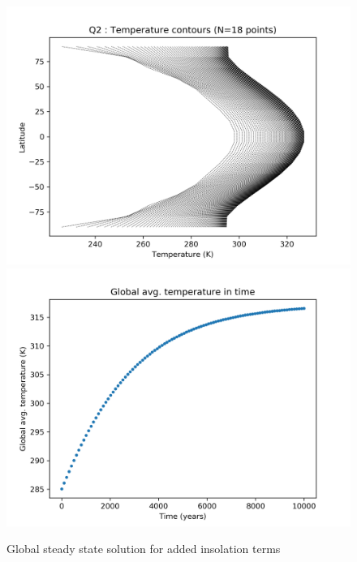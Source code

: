 \documentclass{article}
\begin{document}
\begin{figure}
\includegraphics[scale=0.7]{tcont_q2.png} 
\includegraphics[scale=0.7]{tavg_q2.png}
\caption{Global steady state solution for added insolation terms}
\end{figure}
\end{document}

